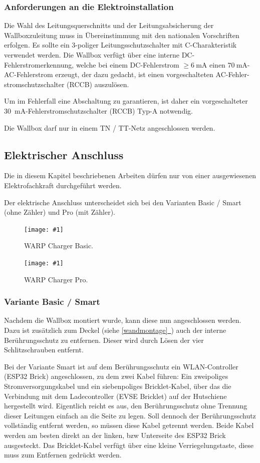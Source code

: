 \documentclass[a4paper,10pt]{article}
\newcommand{\hint}[1]{\begin{tcolorbox}[colback=boxgray,colframe=black,coltext=
white,title=Hinweis]#1\end{tcolorbox}}
\newcommand{\gfx}[1]{\texttt{[image: \#1]}}
\newcommand*{\fullref}[1]{\hyperref[{#1}]{\ref*{#1}~\nameref*{#1}}}
\begin{document}
\begin{multicols*}{2}
	\subsubsection{Anforderungen an die Elektroinstallation}
	Die Wahl des Leitungsquerschnitts und der Leitungsabsicherung der
	Wallboxzuleitung muss in Übereinstimmung mit den nationalen Vorschriften
	erfolgen. Es sollte ein 3-poliger Leitungsschutzschalter mit C-Charakteristik
	verwendet werden.
	Die Wallbox verfügt über eine interne DC-Fehlerstromerkennung, welche
	bei einem DC-Fehlerstrom $\geq \SI{6}{\milli\ampere}$ einen
	$\SI{70}{\milli\ampere}$-AC-Fehlerstrom erzeugt, der dazu gedacht, ist einen
	vorgeschalteten AC-Fehler-stromschutzschalter (RCCB) auszulösen.
	\hint{Um im Fehlerfall eine Abschaltung zu garantieren, ist daher ein vorgeschalteter
		\SI{30}{\milli\ampere}-Fehlerstromschutzschalter (RCCB) Typ-A notwendig.}
	Die Wallbox darf nur in einem TN / TT-Netz angeschlossen werden.

	\newpage
	\subsection{Elektrischer Anschluss}
	\hint{Die in diesem Kapitel beschriebenen Arbeiten dürfen nur von einer ausgewiesenen
		Elektrofachkraft durchgeführt werden.}
	Der elektrische Anschluss unterscheidet sich bei den Varianten Basic / Smart
	(ohne Zähler) und Pro (mit Zähler).

	\begin{figure}[H]
		\gfx{./img/resized/warp_basic_inlay_ready}
		\caption*{WARP Charger Basic.}
	\end{figure}

	\begin{figure}[H]
		\gfx{./img/resized/warp_pro_inlay_ready}
		\caption*{WARP Charger Pro.}
	\end{figure}

	\subsubsection{Variante Basic / Smart}
	Nachdem die Wallbox montiert wurde, kann diese nun angeschlossen werden. Dazu
	ist zusätzlich zum Deckel (siehe \fullref{wandmontage}) auch der interne
	Berührungsschutz zu entfernen. Dieser wird durch Lösen der vier
	Schlitzschrauben entfernt.

	Bei der Variante Smart ist auf dem Berührungsschutz ein WLAN-Controller (ESP32 Brick)
	angeschlossen, zu dem zwei Kabel führen: Ein zweipoliges
	Stromversorgungskabel und ein siebenpoliges Bricklet-Kabel, über das die Verbindung mit dem
	Ladecontroller (EVSE Bricklet) auf der Hutschiene hergestellt wird. Eigentlich reicht es aus,
	den Berührungsschutz ohne Trennung dieser Leitungen einfach an die Seite zu
	legen. Soll dennoch der Berührungsschutz vollständig entfernt werden, so
	müssen diese Kabel getrennt werden. Beide Kabel werden am besten direkt
	an der linken, bzw Unterseite des ESP32 Brick ausgesteckt.
	Das Bricklet-Kabel verfügt über eine kleine Verriegelungstaste,
	diese muss zum Entfernen gedrückt werden.


\end{multicols*}
\end{document}
